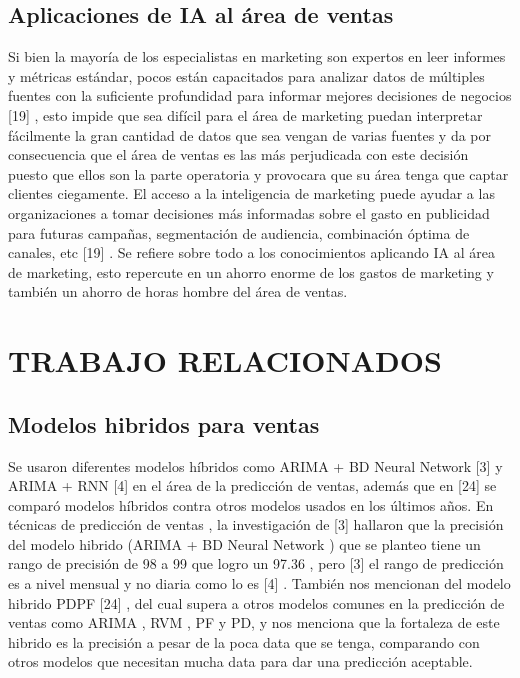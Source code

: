 \documentclass[conference]{IEEEtran}
\begin{document}
\subsection{Aplicaciones de IA al área de ventas}
Si bien la mayoría de los especialistas en marketing son expertos en leer informes
y métricas estándar, pocos están capacitados para analizar datos de múltiples
fuentes con la suficiente profundidad para informar mejores decisiones de
negocios [19] , esto impide que sea difícil para el área de marketing puedan
interpretar fácilmente la gran cantidad de datos que sea vengan de varias fuentes y
da por consecuencia que el área de ventas es las más perjudicada con este decisión
puesto que ellos son la parte operatoria y provocara que su área tenga que captar
clientes ciegamente.
El acceso a la inteligencia de marketing puede ayudar a las organizaciones a tomar
decisiones más informadas sobre el gasto en publicidad para futuras campañas,
segmentación de audiencia, combinación óptima de canales, etc [19] . Se refiere
sobre todo a los conocimientos aplicando IA al área de marketing, esto repercute
en un ahorro enorme de los gastos de marketing y también un ahorro de horas
hombre del área de ventas.\\
\section{TRABAJO RELACIONADOS}

\subsection{Modelos hibridos para ventas}
Se usaron diferentes modelos híbridos como ARIMA + BD Neural Network [3] y
ARIMA + RNN [4] en el área de la predicción de ventas, además que en [24] se
comparó modelos híbridos contra otros modelos usados en los últimos años.
En técnicas de predicción de ventas , la investigación de [3] hallaron que la
precisión del modelo hibrido (ARIMA + BD Neural Network ) que se planteo tiene un
rango de precisión de 98 a 99%
que logro un 97.36 , pero [3] el rango de predicción es a nivel mensual y no diaria
como lo es [4] . También nos mencionan del modelo hibrido PDPF [24] , del cual
supera a otros modelos comunes en la predicción de ventas como ARIMA , RVM ,
PF y PD, y nos menciona que la fortaleza de este hibrido es la precisión a pesar de
la poca data que se tenga, comparando con otros modelos que necesitan mucha
data para dar una predicción aceptable.\\
\end{document}

